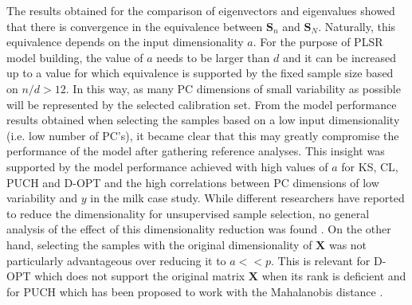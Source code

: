 \documentclass[journal=ancham,manuscript=article]{achemso}
\begin{document}
The results obtained for the comparison of eigenvectors and eigenvalues showed that there is convergence in the equivalence between $\mathbf{S}_n$ and $\mathbf{S}_N$. Naturally, this equivalence depends on the input dimensionality $a$. For the purpose of PLSR model building, the value of $a$ needs to be larger than $d$ and it can be increased up to a value for which equivalence is supported by the fixed sample size based on $n/d>12$. In this way, as many PC dimensions of small variability as possible will be represented by the selected calibration set. From the model performance results obtained when selecting the samples based on a low input dimensionality (i.e. low number of PC's), it became clear that this may greatly compromise the performance of the model after gathering reference analyses. This insight was supported by the model performance achieved with high values of $a$ for KS, CL, PUCH and D-OPT and the high correlations between PC dimensions of low variability and $y$ in the milk case study. While different researchers have reported to reduce the dimensionality for unsupervised sample selection, no general analysis of the effect of this dimensionality reduction was found \cite{Naes1990, Brandmaier2012, Nawar2018, Au2020}. On the other hand, selecting the samples with the original dimensionality of $\mathbf{X}$ was not particularly advantageous over reducing it to $a<<p$. This is relevant for D-OPT which does not support the original matrix $\mathbf{X}$ when its rank is deficient and for PUCH which has been proposed to work with the Mahalanobis distance \cite{Puchwein1988}.
\end{document}
